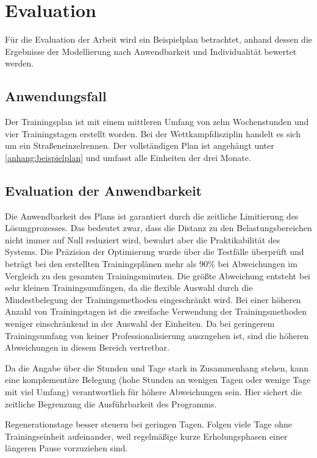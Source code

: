 \chapter{Evaluation}
\label{sec:evaluation}
Für die Evaluation der Arbeit wird ein Beispielplan betrachtet, anhand dessen die Ergebnisse der Modellierung nach Anwendbarkeit und Individualität bewertet werden.

\section{Anwendungsfall}
Der Trainingsplan ist mit einem mittleren Umfang von zehn Wochenstunden und vier Trainingstagen erstellt worden. Bei der Wettkampfdisziplin handelt es sich um ein Straßeneinzelrennen. Der vollständigen Plan ist angehängt unter \ref{anhang:beispielplan} und umfasst alle Einheiten der drei Monate.

\section{Evaluation der Anwendbarkeit}
Die Anwendbarkeit des Plans ist garantiert durch die zeitliche Limitierung des Lösungprozesses. Das bedeutet zwar, dass die Distanz zu den Belastungsbereichen nicht immer auf Null reduziert wird, bewahrt aber die Praktikabilität des Systems. Die Präzision der Optimierung wurde über die Testfälle überprüft und beträgt bei den erstellten Trainingsplänen mehr als 90\% bei Abweichungen im Vergleich zu den gesamten Trainingsminuten. Die größte Abweichung entsteht bei sehr kleinen Trainingsumfängen, da die flexible Auswahl durch die Mindestbelegung der Trainingsmethoden eingeschränkt wird. Bei einer höheren Anzahl von Trainingstagen ist die zweifache Verwendung der Trainingsmethoden weniger einschränkend in der Auswahl der Einheiten. Da bei geringerem Trainingsumfang von keiner Professionalisierung auszugehen ist, sind die höheren Abweichungen in diesem Bereich vertretbar. \par
Da die Angabe über die Stunden und Tage stark in Zusammenhang stehen, kann eine komplementäre Belegung (hohe Stunden an wenigen Tagen oder wenige Tage mit viel Umfang) verantwortlich für höhere Abweichungen sein. Hier sichert die zeitliche Begrenzung die Ausführbarkeit des Programms.

Regenerationstage besser steuern bei geringen Tagen. Folgen viele Tage ohne Trainingseinheit aufeinander, weil regelmäßige kurze Erholungsphasen einer längeren Pause vorzuziehen sind.


